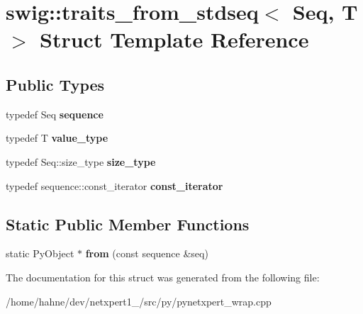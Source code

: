 \hypertarget{structswig_1_1traits__from__stdseq}{}\section{swig\+:\+:traits\+\_\+from\+\_\+stdseq$<$ Seq, T $>$ Struct Template Reference}
\label{structswig_1_1traits__from__stdseq}
\subsection*{Public Types}
\begin{DoxyCompactItemize}
\item 
typedef Seq {\bfseries sequence}\hypertarget{structswig_1_1traits__from__stdseq_ad784f89c80055794b0da097a644ab7ab}{}\label{structswig_1_1traits__from__stdseq_ad784f89c80055794b0da097a644ab7ab}

\item 
typedef T {\bfseries value\+\_\+type}\hypertarget{structswig_1_1traits__from__stdseq_a2159701c1eaadbf75d9b3014fea48706}{}\label{structswig_1_1traits__from__stdseq_a2159701c1eaadbf75d9b3014fea48706}

\item 
typedef Seq\+::size\+\_\+type {\bfseries size\+\_\+type}\hypertarget{structswig_1_1traits__from__stdseq_a1189d4a7cea9e522a7c10ed7ff2ce232}{}\label{structswig_1_1traits__from__stdseq_a1189d4a7cea9e522a7c10ed7ff2ce232}

\item 
typedef sequence\+::const\+\_\+iterator {\bfseries const\+\_\+iterator}\hypertarget{structswig_1_1traits__from__stdseq_ab1c085e18d48f5f0afe549b4dc885290}{}\label{structswig_1_1traits__from__stdseq_ab1c085e18d48f5f0afe549b4dc885290}

\end{DoxyCompactItemize}
\subsection*{Static Public Member Functions}
\begin{DoxyCompactItemize}
\item 
static Py\+Object $\ast$ {\bfseries from} (const sequence \&seq)\hypertarget{structswig_1_1traits__from__stdseq_ab65e9ff3dbb76a137536483c6121584b}{}\label{structswig_1_1traits__from__stdseq_ab65e9ff3dbb76a137536483c6121584b}

\end{DoxyCompactItemize}


The documentation for this struct was generated from the following file\+:\begin{DoxyCompactItemize}
\item 
/home/hahne/dev/netxpert1\+\_/src/py/pynetxpert\+\_\+wrap.\+cpp\end{DoxyCompactItemize}
